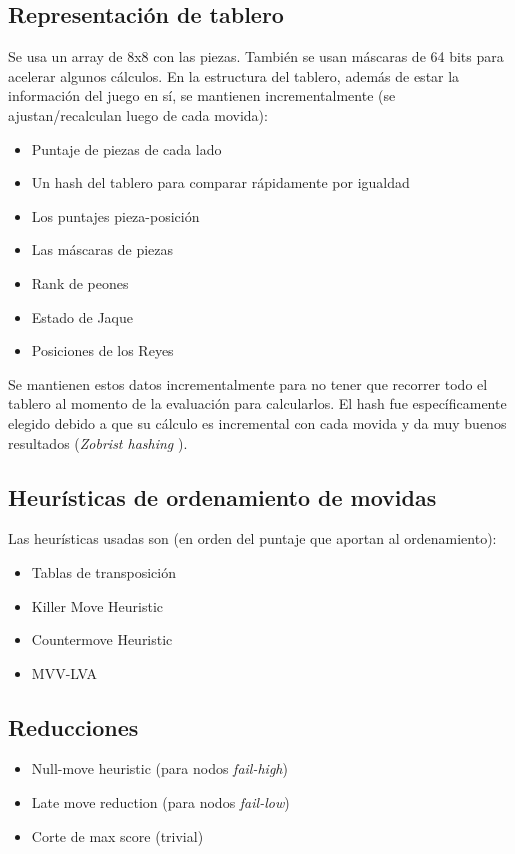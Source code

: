 \documentclass{article}
\begin{document}
\subsection{Representación de tablero}
Se usa un array de 8x8 con las piezas. También se usan máscaras
de 64 bits para acelerar algunos cálculos. En la estructura del
tablero, además de estar la información del juego en sí, se mantienen
incrementalmente (se ajustan/recalculan luego de cada movida):

\begin{itemize}
\item Puntaje de piezas de cada lado
\item Un hash del tablero para comparar rápidamente por igualdad
\item Los puntajes pieza-posición
\item Las máscaras de piezas
\item Rank de peones
\item Estado de Jaque
\item Posiciones de los Reyes
\end{itemize}

Se mantienen estos datos incrementalmente para no tener que recorrer
todo el tablero al momento de la evaluación para calcularlos. El hash
fue específicamente elegido debido a que su cálculo es incremental
con cada movida y da muy buenos resultados (\emph{Zobrist hashing}
\cite{zobrist}).

\subsection{Heurísticas de ordenamiento de movidas}

Las heurísticas usadas son (en orden del puntaje que aportan al
ordenamiento):
\begin{itemize}
\item Tablas de transposición
\item Killer Move Heuristic
\item Countermove Heuristic
\item MVV-LVA
\end{itemize}

\subsection{Reducciones}

\begin{itemize}
\item Null-move heuristic (para nodos \emph{fail-high})
\item Late move reduction (para nodos \emph{fail-low})
\item Corte de max score (trivial)
\end{itemize}
\end{document}
